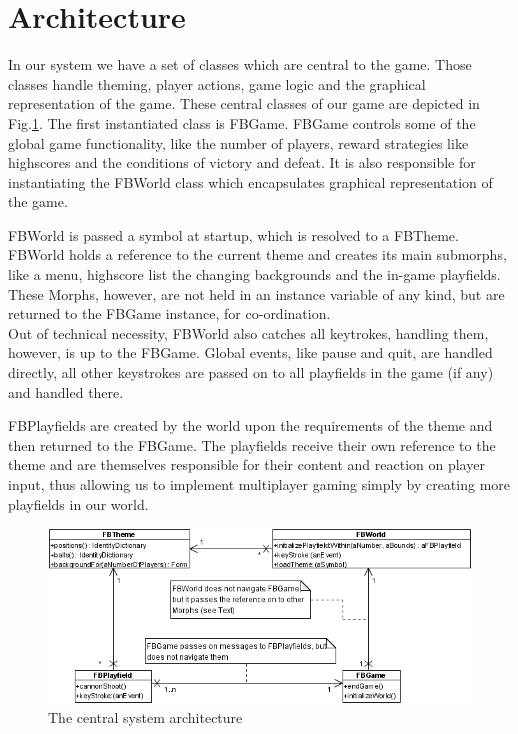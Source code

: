 \section{Architecture}
In our system we have a set of classes which are central to the 
game. Those classes handle theming, player actions, game logic 
and the graphical representation of the game. These central
classes of our game are depicted in Fig.\ref{fig:architecture}.
%
The first instantiated class is FBGame. FBGame controls some of the global 
game functionality, like the number of players, reward strategies like 
highscores and the conditions of victory and defeat. It is also responsible 
for instantiating the FBWorld class which encapsulates graphical 
representation of the game.

FBWorld is passed a symbol at startup, which is resolved to a FBTheme. FBWorld 
holds a reference to the current theme and creates its main submorphs, like
a menu, highscore list the changing backgrounds and the in-game playfields.
These Morphs, however, are not held in an instance variable of any kind, but 
are returned to the FBGame instance, for co-ordination.\\
Out of technical necessity, FBWorld also catches all keytrokes, handling them, 
however, is up to the FBGame. Global events, like pause and quit, are handled 
directly, all other keystrokes are passed on to all playfields in the game (if any)
and handled there.

FBPlayfields are created by the world upon the requirements of the theme
and then returned to the FBGame. The playfields receive their own reference 
to the theme and are themselves responsible for their content and reaction on 
player input, thus allowing us to implement multiplayer gaming simply by creating 
more playfields in our world.
%
\begin{figure}[bt]
  \begin{center}
    \includegraphics[width=0.6\linewidth]{images/architecture.png}
  \end{center}
  \caption{The central system architecture}
  \label{fig:architecture}
\end{figure}


